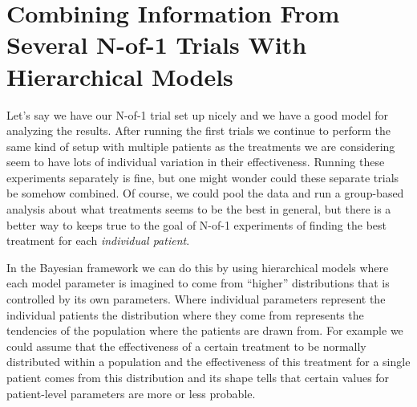 \documentclass[12pt,a4paper,leqno]{report}
\theoremstyle{plain}
\theoremstyle{definition}
\theoremstyle{remark}
\begin{document}
\chapter{Combining Information From Several N-of-1 Trials With Hierarchical
  Models}\label{hierarchicalbayes}

Let's say we have our N-of-1 trial set up nicely and we have a good model for analyzing the
results. After running the first trials we continue to perform the same kind of setup
with multiple patients as the treatments we are considering seem to have lots of
individual variation in their effectiveness. Running these experiments separately is
fine, but one might wonder could these separate trials be somehow combined. Of course, we could pool the data and run a group-based
analysis about what treatments seems to be the best in general, but there is a better
way to keeps true to the goal of N-of-1 experiments of finding the best treatment for
each \emph{individual patient}.

In the Bayesian framework we can do this by using hierarchical
models where each model parameter is imagined to come from ``higher'' distributions
that is controlled by its own parameters. Where individual parameters represent the
individual patients the distribution where they come from represents the tendencies of
the population where the patients are drawn from. For example we could assume that the
effectiveness of a certain treatment to be normally distributed within a
population and the effectiveness of this treatment for a single patient
comes from this distribution and its shape tells that certain values for
patient-level parameters are more or less probable.


\bigskip
\end{document}
